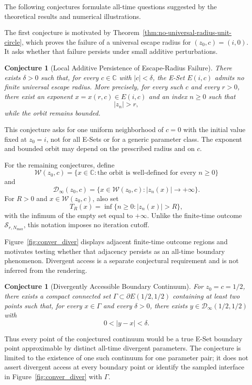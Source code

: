 \documentclass[12pt,a4paper]{amsart}
\newtheorem{conjecture}[theorem]{Conjecture}
\theoremstyle{remark}
\newcommand{\C}{\mathbb{C}}
\begin{document}
The following conjectures formulate all-time questions suggested by the
theoretical results and numerical illustrations.

The first conjecture is motivated by
Theorem~\ref{thm:no-universal-radius-unit-circle}, which proves the failure of a
universal escape radius for $(z_0,c)=(i,0)$. It asks whether that failure
persists under small additive perturbations.

\begin{conjecture}[Local Additive Persistence of Escape-Radius Failure]
\label{conj:broad-no-universal-escape}
There exists $\delta>0$ such that, for every $c\in\C$ with $|c|<\delta$, the
E-Set $E(i,c)$ admits no finite universal escape radius. More precisely, for
every such $c$ and every $r>0$, there exist an exponent
$x=x(r,c)\in E(i,c)$ and an index $n\ge0$ such that
\[
|z_n|>r,
\]
while the orbit remains bounded.
\end{conjecture}

This conjecture asks for one uniform neighborhood of $c=0$ with the initial
value fixed at $z_0=i$, not for all E-Sets or for a generic parameter class.
The exponent and bounded orbit may depend on the prescribed radius and on $c$.

For the remaining conjectures, define
\[
\mathcal{W}(z_0,c)
=
\{x\in\C:\text{the orbit is well-defined for every }n\ge0\}
\]
and
\[
\mathcal{D}_{\infty}(z_0,c)
=
\{x\in\mathcal{W}(z_0,c):|z_n(x)|\to+\infty\}.
\]
For $R>0$ and $x\in\mathcal{W}(z_0,c)$, also set
\[
T_R(x)=\inf\{n\ge0:|z_n(x)|>R\},
\]
with the infimum of the empty set equal to $+\infty$. Unlike the finite-time
outcome $\mathcal{S}_{r,N_{\max}}$, this notation imposes no iteration cutoff.

Figure~\ref{fig:conver_diver} displays adjacent finite-time outcome regions
and motivates testing whether that adjacency persists as an all-time boundary
phenomenon. Divergent access is a separate conjectural requirement and is not
inferred from the rendering.

\begin{conjecture}[Divergently Accessible Boundary Continuum]
\label{conj:boundary_divergence}
For $z_0=c=1/2$, there exists a compact connected set
$\Gamma\subset\partial E(1/2,1/2)$ containing at least two points such that,
for every $x\in\Gamma$ and every $\delta>0$, there exists
$y\in\mathcal{D}_{\infty}(1/2,1/2)$ with
\[
0<|y-x|<\delta.
\]
\end{conjecture}

Thus every point of the conjectured continuum would be a true E-Set boundary
point approximable by distinct all-time divergent parameters. The conjecture
is limited to the existence of one such continuum for one parameter pair; it
does not assert divergent access at every boundary point or identify the
sampled interface in Figure~\ref{fig:conver_diver} with $\Gamma$.
\end{document}
